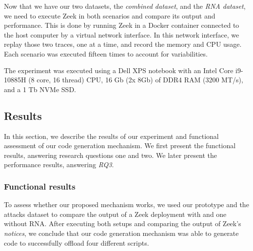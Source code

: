 Now that we have our two datasets, the \textit{combined dataset}, and the \textit{RNA dataset}, we need to execute Zeek in both scenarios and compare its output and performance. This is done by running Zeek in a Docker container connected to the host computer by a virtual network interface. In this network interface, we replay those two traces, one at a time, and record the memory and CPU usage. Each scenario was executed fifteen times to account for variabilities.

The experiment was executed using a Dell XPS notebook with an Intel Core i9-10885H (8 core, 16 thread) CPU, 16 Gb (2x 8Gb) of DDR4 RAM (3200 MT/s), and a 1 Tb NVMe SSD.





\subsection{Results}

In this section, we describe the results of our experiment and functional assessment of our code generation mechanism. We first present the functional results, answering research questions one and two. We later present the performance results, answering \textit{RQ3}.

\subsubsection*{Functional results}

To assess whether our proposed mechanism works, we used our prototype and the attacks dataset to compare the output of a Zeek deployment with and one without RNA. After executing both setups and comparing the output of Zeek's \textit{notices}, we conclude that our code generation mechanism was able to generate code to successfully offload four different scripts.

